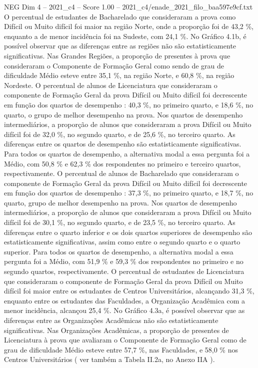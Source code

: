 \begin{textsample}{NEG Dim 4 – 2021\_c4 – Score 1.00 – 2021\_c4/enade\_2021\_filo\_baa597e9cf.txt}
O percentual de estudantes de Bacharelado que consideraram a prova como Difícil ou Muito difícil foi maior na região Norte, onde a proporção foi de 43,2 \%, enquanto a de menor incidência foi na Sudeste, com 24,1 \%.
No Gráfico 4.1b, é possível observar que as diferenças entre as regiões não são estatisticamente significativas.
Nas Grandes Regiões, a proporção de presentes à prova que consideraram o Componente de Formação Geral como sendo de grau de dificuldade Médio esteve entre 35,1 \%, na região Norte, e 60,8 \%, na região Nordeste.
O percentual de alunos de Licenciatura que consideraram o componente de Formação Geral da prova Difícil ou Muito difícil foi decrescente em função dos quartos de desempenho : 40,3 \%, no primeiro quarto, e 18,6 \%, no quarto, o grupo de melhor desempenho na prova.
Nos quartos de desempenho intermediários, a proporção de alunos que consideraram a prova Difícil ou Muito difícil foi de 32,0 \%, no segundo quarto, e de 25,6 \%, no terceiro quarto.
As diferenças entre os quartos de desempenho são estatisticamente significativas.
Para todos os quartos de desempenho, a alternativa modal a essa pergunta foi a Médio, com 50,8 \% e 62,3 \% dos respondentes no primeiro e terceiro quartos, respectivamente.
O percentual de alunos de Bacharelado que consideraram o componente de Formação Geral da prova Difícil ou Muito difícil foi decrescente em função dos quartos de desempenho : 37,3 \%, no primeiro quarto, e 18,7 \%, no quarto, grupo de melhor desempenho na prova.
Nos quartos de desempenho intermediários, a proporção de alunos que consideraram a prova Difícil ou Muito difícil foi de 30,1 \%, no segundo quarto, e de 23,5 \%, no terceiro quarto.
As diferenças entre o quarto inferior e os dois quartos superiores de desempenho são estatisticamente significativas, assim como entre o segundo quarto e o quarto superior.
Para todos os quartos de desempenho, a alternativa modal a essa pergunta foi a Médio, com 51,9 \% e 59,3 \% dos respondentes no primeiro e no segundo quartos, respectivamente.
O percentual de estudantes de Licenciatura que consideraram o componente de Formação Geral da prova Difícil ou Muito difícil foi maior entre os estudantes de Centros Universitários, alcançando 31,3 \%, enquanto entre os estudantes das Faculdades, a Organização Acadêmica com a menor incidência, alcançou 25,4 \%.
No Gráfico 4.3a, é possível observar que as diferenças entre as Organizações Acadêmicas não são estatisticamente significativas.
Nas Organizações Acadêmicas, a proporção de presentes de Licenciatura à prova que avaliaram o Componente de Formação Geral como de grau de dificuldade Médio esteve entre 57,7 \%, nas Faculdades, e 58,0 \% nos Centros Universitários ( ver também a Tabela II.2a, no Anexo IIA ).

\end{textsample}
